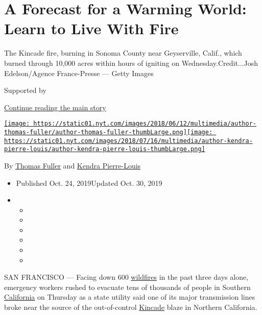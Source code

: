 \hypertarget{a-forecast-for-a-warming-world-learn-to-live-with-fire}{%
\section{A Forecast for a Warming World: Learn to Live With
Fire}\label{a-forecast-for-a-warming-world-learn-to-live-with-fire}}

The Kincade fire, burning in Sonoma County near Geyserville, Calif.,
which burned through 10,000 acres within hours of igniting on
Wednesday.Credit...Josh Edelson/Agence France-Presse --- Getty Images

Supported by

\protect\hyperlink{after-sponsor}{Continue reading the main story}

\href{https://www.nytimes.com/by/thomas-fuller}{\texttt{[image: https://static01.nyt.com/images/2018/06/12/multimedia/author-thomas-fuller/author-thomas-fuller-thumbLarge.png]}}\href{https://www.nytimes.com/by/kendra-pierre-louis}{\texttt{[image: https://static01.nyt.com/images/2018/07/16/multimedia/author-kendra-pierre-louis/author-kendra-pierre-louis-thumbLarge.png]}}

By \href{https://www.nytimes.com/by/thomas-fuller}{Thomas Fuller} and
\href{https://www.nytimes.com/by/kendra-pierre-louis}{Kendra
Pierre-Louis}

\begin{itemize}
\item
  Published Oct. 24, 2019Updated Oct. 30, 2019
\item
  \begin{itemize}
  \item
  \item
  \item
  \item
  \item
  \item
  \end{itemize}
\end{itemize}

SAN FRANCISCO --- Facing down 600
\href{https://www.nytimes.com/2019/10/28/us/california-fires-getty-kincade-tick-sonoma-county.html}{wildfires}
in the past three days alone, emergency workers rushed to evacuate tens
of thousands of people in Southern
\href{https://www.nytimes.com/2019/10/24/us/california-fires-today.html}{California}
on Thursday as a state utility said one of its major transmission lines
broke near the source of the out-of-control
\href{https://www.nytimes.com/2019/10/24/us/california-fires-today.html}{Kincade}
blaze in Northern California.

